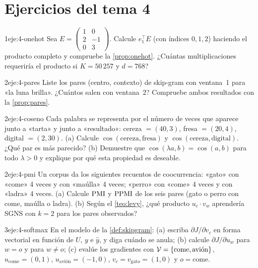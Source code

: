 \section*{Ejercicios del tema 4}

\begin{ejercicio}{1}{eje:4-onehot}
Sea $E=\begin{pmatrix}1&0\\2&-1\\0&3\end{pmatrix}$. Calcule $e_1^{\top}E$ (con índices $0,1,2$) haciendo el producto completo y compruebe la \cref{prop:onehot}. ¿Cuántas multiplicaciones requeriría el producto si $K=50\,257$ y $d=768$?
\end{ejercicio}

\begin{ejercicio}{2}{eje:4-pares}
Liste los pares (centro, contexto) de skip-gram con ventana~1 para «la luna brilla». ¿Cuántos salen con ventana~2? Compruebe ambos resultados con la \cref{prop:pares}.
\end{ejercicio}

\begin{ejercicio}{2}{eje:4-coseno}
Cada palabra se representa por el número de veces que aparece junto a «tarta» y junto a «resultado»: cereza $=(40,3)$, fresa $=(20,4)$, digital $=(2,30)$. (a) Calcule $\cos(\text{cereza},\text{fresa})$ y $\cos(\text{cereza},\text{digital})$. ¿Qué par es más parecido? (b) Demuestre que $\cos(\lambda a,b)=\cos(a,b)$ para todo $\lambda>0$ y explique por qué esta propiedad es deseable.
\end{ejercicio}

\begin{ejercicio}{2}{eje:4-pmi}
Un corpus da los siguientes recuentos de coocurrencia: «gato» con «come» 4 veces y con «maúlla» 4 veces; «perro» con «come» 4 veces y con «ladra» 4 veces. (a) Calcule $\operatorname{PMI}$ y $\operatorname{PPMI}$ de los seis pares (gato o perro con come, maúlla o ladra). (b) Según el \cref{teo:levy}, ¿qué producto $u_c\cdot v_w$ aprendería SGNS con $k=2$ para los pares observados?
\end{ejercicio}

\begin{ejercicio}{3}{eje:4-softmax}
En el modelo de la \cref{def:skipgram}: (a) escriba $\partial J/\partial v_c$ en forma vectorial en función de $U$, $y$ e $\hat y$, y diga cuándo se anula; (b) calcule $\partial J/\partial u_w$ para $w=o$ y para $w\neq o$; (c) evalúe los gradientes con $\mathcal{V}=\{\text{come},\text{avión}\}$, $u_{\text{come}}=(0,1)$, $u_{\text{avión}}=(-1,0)$, $v_c=v_{\text{gato}}=(1,0)$ y $o=\text{come}$.
\end{ejercicio}

